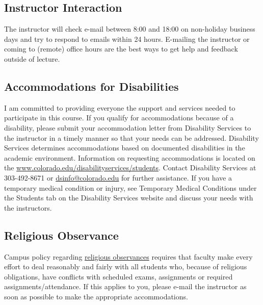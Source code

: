 \documentclass[10pt]{memoir}
\begin{document}
\subsection{Instructor Interaction}
The instructor will check e-mail between 8:00 and 18:00 on non-holiday business days and try to respond to emails within 24 hours. E-mailing the instructor or coming to (remote) office hours are the best ways to get help and feedback outside of lecture.

\subsection{Accommodations for Disabilities}
I am committed to providing everyone the support and services needed to participate in this course. If you qualify for accommodations because of a disability, please submit your accommodation letter from Disability Services to the instructor in a timely manner so that your needs can be addressed. Disability Services determines accommodations based on documented disabilities in the academic environment. Information on requesting accommodations is located on the \href{Disability Services website}{www.colorado.edu/disabilityservices/students}. Contact Disability Services at 303-492-8671 or \href{mailto:dsinfo@colorado.edu}{dsinfo@colorado.edu} for further assistance. If you have a temporary medical condition or injury, see Temporary Medical Conditions under the Students tab on the Disability Services website and discuss your needs with the instructors.

\subsection{Religious Observance}
Campus policy regarding \href{http://www.colorado.edu/policies/observance-religious-holidays-and-absences-classes-andor-exams}{religious observances} requires that faculty make every effort to deal reasonably and fairly with all students who, because of religious obligations, have conflicts with scheduled exams, assignments or required assignments/attendance. If this applies to you, please e-mail the instructor as soon as possible to make the appropriate accommodations.
\end{document}
